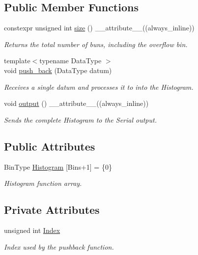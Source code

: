 \subsection*{Public Member Functions}
\begin{DoxyCompactItemize}
\item 
constexpr unsigned int \hyperlink{classPCHistogram_a4c7558c7cebdd928c0b6e0c548baf1b9}{size} () \+\_\+\+\_\+attribute\+\_\+\+\_\+((always\+\_\+inline))
\begin{DoxyCompactList}\small\item\em Returns the total number of buns, including the overflow bin. \end{DoxyCompactList}\item 
{\footnotesize template$<$typename Data\+Type $>$ }\\void \hyperlink{classPCHistogram_a0885e66d0de46bd16b72b870d7f410fc}{push\+\_\+back} (Data\+Type datum)
\begin{DoxyCompactList}\small\item\em Receives a single datum and processes it to into the Histogram. \end{DoxyCompactList}\item 
void \hyperlink{classPCHistogram_af4391ac8ad3f4d9865ee6335fb563b4c}{output} () \+\_\+\+\_\+attribute\+\_\+\+\_\+((always\+\_\+inline))
\begin{DoxyCompactList}\small\item\em Sends the complete Histogram to the Serial output. \end{DoxyCompactList}\end{DoxyCompactItemize}
\subsection*{Public Attributes}
\begin{DoxyCompactItemize}
\item 
Bin\+Type \hyperlink{classPCHistogram_a239c7b1e34b2ecc1808e2304d71bc1e2}{Histogram} \mbox{[}Bins+1\mbox{]} = \{0\}
\begin{DoxyCompactList}\small\item\em Histogram function array. \end{DoxyCompactList}\end{DoxyCompactItemize}
\subsection*{Private Attributes}
\begin{DoxyCompactItemize}
\item 
unsigned int \hyperlink{classPCHistogram_a3d0371659763511d752c3348db978f79}{Index}
\begin{DoxyCompactList}\small\item\em Index used by the pushback function. \end{DoxyCompactList}\end{DoxyCompactItemize}


